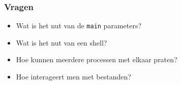 \begin{frame}
  \frametitle{Vragen}
  \begin{itemize}
    \item Wat is het nut van de \texttt{main} parameters?
    \item Wat is het nut van een shell?
    \item Hoe kunnen meerdere processen met elkaar praten?
    \item Hoe interageert men met bestanden?
  \end{itemize}
\end{frame}


